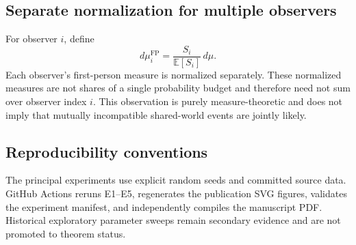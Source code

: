 \subsection{Separate normalization for multiple observers}

For observer $i$, define
\[
d\mu_i^{\mathrm{FP}}
=
\frac{S_i}{\mathbb E[S_i]}
\,d\mu.
\]
Each observer's first-person measure is normalized separately. These normalized measures are not shares of a single probability budget and therefore need not sum over observer index $i$. This observation is purely measure-theoretic and does not imply that mutually incompatible shared-world events are jointly likely.

\subsection{Reproducibility conventions}

The principal experiments use explicit random seeds and committed source data. GitHub Actions reruns E1--E5, regenerates the publication SVG figures, validates the experiment manifest, and independently compiles the manuscript PDF. Historical exploratory parameter sweeps remain secondary evidence and are not promoted to theorem status.